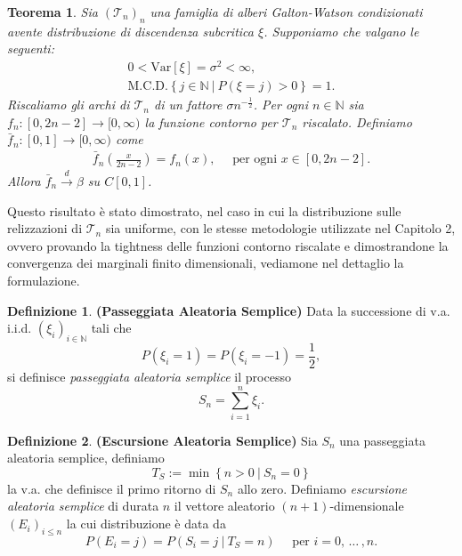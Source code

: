 \documentclass[11pt, twoside]{report}
\newcommand{\Tt}{\mathscr{T}}
\theoremstyle{definition}
\newtheorem{definizione}{Definizione}[chapter]
\theoremstyle{plain}
\newtheorem{teo}{Teorema}[chapter]
\theoremstyle{remark}
\numberwithin{equation}{chapter}
\begin{document}
\begin{teo} \label{teo_conv_gener}
Sia $\left(\Tt_n\right)_n$ una famiglia di alberi Galton-Watson condizionati avente distribuzione di discendenza subcritica $\xi$. Supponiamo che valgano le seguenti:
\begin{gather}
0<\mathrm{Var}[\xi]=\sigma^2<\infty, \nonumber \\
\mathrm{M.C.D.}\left\{j\in\mathbb{N} \ | \ P\left(\xi=j\right)>0\right\}=1. \nonumber
\end{gather}
Riscaliamo gli archi di $\Tt_n$ di un fattore $\sigma n^{-\frac{1}{2}}$. Per ogni $n\in \mathbb{N}$ sia ${f_n:[0,2n-2]\longrightarrow [0,\infty)}$ la funzione contorno per $\Tt_n$ riscalato. Definiamo $\bar{f}_n:[0,1]\longrightarrow [0,\infty)$ come
\begin{gather}
\bar{f}_n\left(\frac{x}{2n-2}\right)=f_n(x), \quad \text{ per ogni }  x\in[0,2n-2]. \nonumber
\end{gather}
Allora $\bar{f}_n\xrightarrow{d} \beta$ su $C[0,1]$.
\end{teo}

Questo risultato è stato dimostrato, nel caso in cui la distribuzione sulle relizzazioni di $\Tt_n$ sia uniforme, con le stesse metodologie utilizzate nel Capitolo 2, ovvero provando la tightness delle funzioni contorno riscalate e dimostrandone la convergenza dei marginali finito dimensionali, vediamone nel dettaglio la formulazione.

\begin{definizione}{\textbf{(Passeggiata Aleatoria Semplice)}}
Data la successione di v.a. i.i.d. $\left(\xi_i\right)_{i\in\mathbb{N}}$ tali che 
$$P\left(\xi_i=1\right)=P\left(\xi_i=-1\right)=\frac{1}{2},$$
si definisce \textit{passeggiata aleatoria semplice} il processo
$$S_n=\stackrel{n}{\sum\limits_{i=1}}\xi_i.$$
\end{definizione}

\begin{definizione}{\textbf{(Escursione Aleatoria Semplice)}}
Sia $S_n$ una passeggiata aleatoria semplice, definiamo 
$$T_S:=\min\left\{n>0 \ | \ S_n=0\right\}$$
la v.a. che definisce il primo ritorno di $S_n$ allo zero.
Definiamo \textit{escursione aleatoria semplice} di durata $n$ il vettore aleatorio $(n+1)$-dimensionale $(E_i)_{i\leq n}$ la cui distribuzione è data da
$$P\left(E_i=j\right)= P\left(S_i=j \ | \ T_S=n\right) \quad \text{ per } i=0, \, \dots \, ,n.$$ 
\end{definizione}
\end{document}
